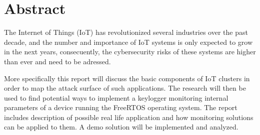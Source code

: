 \chapter*{Abstract}
The Internet of Things (IoT) has revolutionized several industries over the past decade, and the number and importance of IoT systems is only expected to grow in the next years, consecuently, the cybersecurity risks of these systems are higher than ever and need to be adressed.\hfill
\break

More specifically this report will discuss the basic components of IoT clusters in order to map the attack surface of such applications. The research will then be used to find potential ways to implement a keylogger monitoring internal parameters of a device running the FreeRTOS operating system. The report includes description of possible real life application and how monitoring solutions can be applied to them. A demo solution will be implemented and analyzed. \\